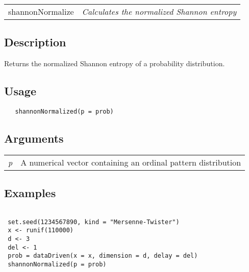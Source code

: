 \documentclass[12pt,letterpaper]{article}
\begin{document}
\hrulefill   

\begin{table}[!ht]
\begin{center}
\begin{tabularx}{\textwidth}{ X X}
\hspace{0.5cm} shannonNormalize & \textit{Calculates the normalized Shannon entropy}\\
\end{tabularx}
\end{center}
\end{table} 

\vspace{-0.5cm}

\hrulefill  

\vspace{0.5cm}

\subsection*{Description}

Returns the normalized Shannon entropy of a probability distribution.

\vspace{0.5cm}

\subsection*{Usage}

\begin{lstlisting}
   shannonNormalized(p = prob)
\end{lstlisting}

\vspace{0.5cm}

\subsection*{Arguments}

\begin{table}[!ht]
\begin{center}
\begin{tabularx}{\textwidth}{X X}
\hspace{0.5cm} \textit{p} & A numerical vector containing an ordinal pattern distribution\\
\end{tabularx}
\end{center}
\end{table} 

\subsection*{Examples}

\begin{lstlisting}
   
 set.seed(1234567890, kind = "Mersenne-Twister")
 x <- runif(110000)
 d <- 3
 del <- 1
 prob = dataDriven(x = x, dimension = d, delay = del)
 shannonNormalized(p = prob)

\end{lstlisting}

\vspace{0.5cm}
\end{document}
